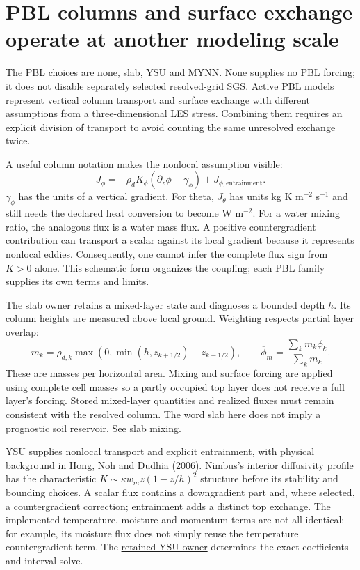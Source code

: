 \section{PBL columns and surface exchange operate at another modeling scale}

The PBL choices are none, slab, YSU and MYNN. None supplies no PBL forcing; it
does not disable separately selected resolved-grid SGS. Active PBL models
represent vertical column transport and surface exchange with different
assumptions from a three-dimensional LES stress. Combining them requires an
explicit division of transport to avoid counting the same unresolved exchange
twice.

A useful column notation makes the nonlocal assumption visible:
\[
 J_\phi=-\rho_dK_\phi(\partial_z\phi-\gamma_\phi)
              +J_{\phi,\mathrm{entrainment}}.
\]
$\gamma_\phi$ has the units of a vertical gradient. For theta, $J_\theta$
has units kg K m$^{-2}$ s$^{-1}$ and still needs the declared heat conversion
to become W m$^{-2}$. For a water mixing ratio, the analogous flux is a water
mass flux. A positive countergradient contribution can transport a scalar
against its local gradient because it represents nonlocal eddies. Consequently,
one cannot infer the complete flux sign from $K>0$ alone. This schematic form
organizes the coupling; each PBL family supplies its own terms and limits.

The slab owner retains a mixed-layer state and diagnoses a bounded depth $h$.
Its column heights are measured above local ground. Weighting respects partial
layer overlap:
\[
 m_k=\rho_{d,k}\max\!\left(0,
       \min(h,z_{k+1/2})-z_{k-1/2}\right),\qquad
 \overline\phi_m=\frac{\sum_km_k\phi_k}{\sum_km_k}.
\]
These are masses per horizontal area. Mixing and surface forcing are applied
using complete cell masses so a partly occupied top layer does not receive a
full layer's forcing. Stored mixed-layer quantities and realized fluxes must
remain consistent with the resolved column. The word slab here does not imply
a prognostic soil reservoir. See
\href{../src/boundary_layer/schemes/slab/slab.cpp}{slab mixing}.

YSU supplies nonlocal transport and explicit entrainment, with physical
background in
\href{https://journals.ametsoc.org/view/journals/mwre/134/9/mwr3199.1.xml}{Hong,
Noh and Dudhia (2006)}. Nimbus's interior diffusivity profile has the
characteristic $K\sim\kappa w_m z(1-z/h)^2$ structure before its stability and
bounding choices. A scalar flux contains a downgradient part and, where
selected, a countergradient correction; entrainment adds a distinct top
exchange. The implemented temperature, moisture and momentum terms are not
all identical: for example, its moisture flux does not simply reuse the
temperature countergradient term. The
\href{../src/boundary_layer/schemes/ysu/ysu.cpp}{retained YSU owner} determines
the exact coefficients and interval solve.

